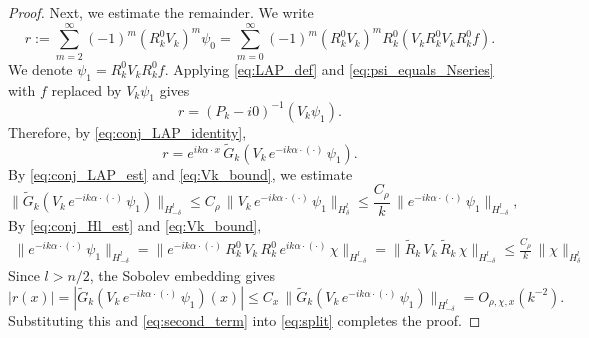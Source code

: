 \documentclass[12pt,a4paper]{amsart}
\numberwithin{equation}{section}
\theoremstyle{plain}
\theoremstyle{definition}
\begin{document}
\begin{proof}
Next, we estimate the remainder. We write
\begin{equation*}
    r := \sum_{m=2}^{\infty} (-1)^m (R_k^0 V_k)^m \psi_0 = \sum_{m=0}^{\infty} (-1)^m (R_k^0 V_k)^m R_k^0 \left(V_k R_k^0 V_k R_k^0 f\right).
\end{equation*}
We denote $\psi_1 = R_k^0 V_k R_k^0 f$. Applying \eqref{eq:LAP_def} and
\eqref{eq:psi_equals_Nseries} with $f$ replaced by $V_k\psi_1$ gives
\begin{equation}\label{eq:r_formula}
r = (P_k - i0)^{-1}(V_k\psi_1).
\end{equation}
Therefore, by \eqref{eq:conj_LAP_identity},
\begin{equation*}
    r = e^{ik\alpha\cdot x}\,\widetilde{G}_k(V_k\, e^{-ik\alpha\cdot (\cdot)} \, \psi_1).
\end{equation*}
By \eqref{eq:conj_LAP_est} and \eqref{eq:Vk_bound}, we estimate
\begin{equation*}
\|\widetilde{G}_k(V_k\, e^{-ik\alpha\cdot (\cdot)} \, \psi_1)\|_{H^l_{-\delta}}
\leq C_\rho \,\|V_k\, e^{-ik\alpha\cdot (\cdot)} \, \psi_1\|_{H^l_\delta}
\leq \frac{C_\rho}{k}\,\|e^{-ik\alpha\cdot (\cdot)} \, \psi_1\|_{H^l_{-\delta}},
\end{equation*}
By \eqref{eq:conj_Hl_est} and \eqref{eq:Vk_bound},
\begin{multline*}
    \|e^{-ik\alpha\cdot (\cdot)} \, \psi_1\|_{H^l_{-\delta}}  
    = 
    \|e^{-ik\alpha\cdot (\cdot)} \, R_k^0 \, V_k \, R_k^0 \, e^{ik\alpha\cdot (\cdot)} \, \chi\|_{H^l_{-\delta}} 
    = 
    \|\widetilde{R}_k \, V_k \, \widetilde{R}_k \, \chi\|_{H^l_{-\delta}} \leq \frac{C_\rho}{k} \, \|\chi\|_{H^l_{\delta}} 
\end{multline*}
Since $l>n/2$, the Sobolev embedding gives
\begin{equation*}
|r(x)| = |\widetilde{G}_k(V_k\, e^{-ik\alpha\cdot (\cdot)} \, \psi_1)(x)|
\leq C_x\,\|\widetilde{G}_k(V_k\, e^{-ik\alpha\cdot (\cdot)} \, \psi_1)\|_{H^l_{-\delta}}
= O_{\rho,\chi,x}(k^{-2}).
\end{equation*}
Substituting this and \eqref{eq:second_term} into \eqref{eq:split} completes the proof.
\end{proof}
\end{document}

